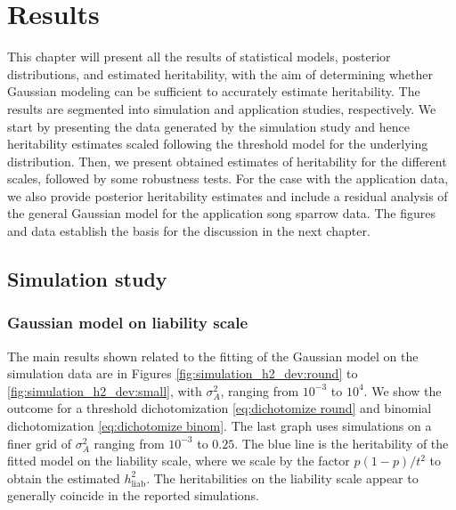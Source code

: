 \chapter{Results}
This chapter will present all the results of statistical models, posterior distributions, and estimated heritability, with the aim of determining whether Gaussian modeling can be sufficient to accurately estimate heritability. The results are segmented into simulation and application studies, respectively. We start by presenting the data generated by the simulation study and hence heritability estimates scaled following the threshold model for the underlying distribution. Then, we present obtained estimates of heritability for the different scales, followed by some robustness tests. For the case with the application data, we also provide posterior heritability estimates and include a residual analysis of the general Gaussian model for the application song sparrow data. The figures and data establish the basis for the discussion in the next chapter.

\section{Simulation study}
\subsection{Gaussian model on liability scale}

The main results shown related to the fitting of the Gaussian model on the simulation data are in Figures \ref{fig:simulation_h2_dev:round} to \ref{fig:simulation_h2_dev:small}, with $\sigma^2_A$, ranging from $10^{-3}$ to $10^4$. We show the outcome for a threshold dichotomization \eqref{eq:dichotomize round} and binomial dichotomization \eqref{eq:dichotomize binom}. The last graph uses simulations on a finer grid of $\sigma^2_A$ ranging from $10^{-3}$ to $0.25$. The blue line is the heritability of the fitted model on the liability scale, where we scale by the factor $p(1-p)/t^2$ to obtain the estimated $h^2_\text{liab}$. The heritabilities on the liability scale appear to generally coincide in the reported simulations.

